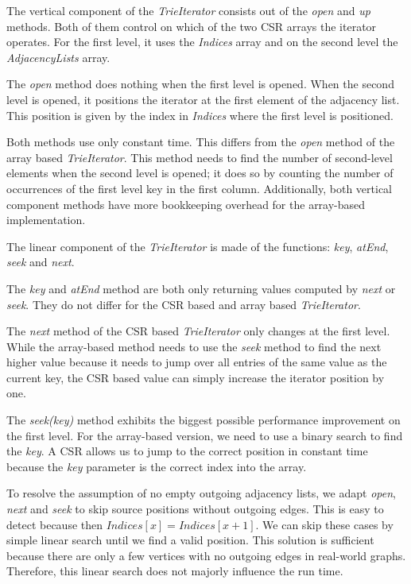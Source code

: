 The vertical component of the \textit{TrieIterator} consists out of the \textit{open} and \textit{up} methods.
Both of them control on which of the two \textsc{CSR} arrays the iterator operates.
For the first level, it uses the \textit{Indices} array and on the second level the \textit{AdjacencyLists} array.

The \textit{open} method does nothing when the first level is opened.
When the second level is opened, it positions the iterator at the first element of the adjacency list.
This position is given by the index in \textit{Indices} where the first level is positioned.

Both methods use only constant time.
This differs from the \textit{open} method of the array based \textit{TrieIterator}.
This method needs to find the number of second-level elements when the second level is opened;
it does so by counting the number of occurrences of the first level key in the first column.
Additionally, both vertical component methods have more bookkeeping overhead for the array-based implementation.

The linear component of the \textit{TrieIterator} is made of the functions: \textit{key}, \textit{atEnd}, \textit{seek} and
\textit{next}.

The \textit{key} and \textit{atEnd} method are both only returning values computed by \textit{next} or \textit{seek}.
They do not differ for the \textsc{CSR} based and array based \textit{TrieIterator}.

The \textit{next} method of the CSR based \textit{TrieIterator} only changes at the first level.
While the array-based method needs to use the \textit{seek} method to find the next higher value because
it needs to jump over all entries of the same value as the current key, the CSR based value can simply increase
the iterator position by one.

The \textit{seek(key)} method exhibits the biggest possible performance improvement on the first level.
For the array-based version, we need to use a binary search to find the \textit{key}.
A CSR allows us to jump to the correct position in constant time because the \textit{key} parameter is the correct
index into the array.

To resolve the assumption of no empty outgoing adjacency lists, we adapt \textit{open}, \textit{next} and \textit{seek} to skip source
positions without outgoing edges.
This is easy to detect because then $Indices[x] = Indices[x + 1]$.
We can skip these cases by simple linear search until we find a valid position.
This solution is sufficient because there are only a few vertices with no outgoing edges in real-world graphs.
Therefore, this linear search does not majorly influence the run time.

